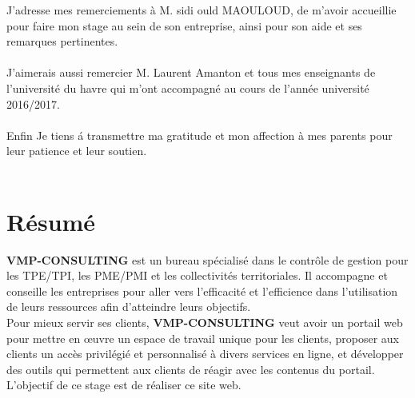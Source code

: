 \documentclass[12pt]{article}
\begin{document}
J’adresse mes remerciements à  M. sidi ould MAOULOUD, de m’avoir accueillie pour faire mon
stage au sein de son entreprise, ainsi pour son aide et  ses  remarques pertinentes.  \\ \\
J’aimerais aussi remercier M. Laurent Amanton  et tous mes enseignants de l’université du havre
qui m’ont accompagné 
au cours de l'année université 2016/2017.\\ \\

Enfin  Je tiens á transmettre ma gratitude et mon affection à mes
parents  pour leur patience et leur soutien.\\ \\


\newpage

\section*{Résumé}
\textbf{VMP-CONSULTING}  est un bureau spécialisé dans le contrôle de gestion pour les TPE/TPI, les PME/PMI et les collectivités territoriales. Il  accompagne et conseille les entreprises pour aller vers l'efficacité et l'efficience dans l'utilisation de leurs ressources afin d'atteindre leurs objectifs.\\
Pour mieux servir ses clients, \textbf{VMP-CONSULTING}  veut avoir un portail web pour 
mettre en œuvre un espace de travail unique pour les clients, 
 proposer aux clients un accès privilégié et personnalisé à divers services en
ligne, et 
développer des outils qui permettent aux clients de réagir avec les contenus du
portail.\\
L'objectif de ce stage est de réaliser ce site web.
\end{document}
